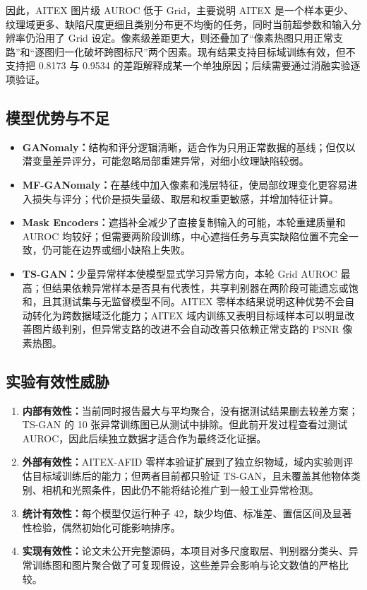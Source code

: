 \documentclass[UTF8,12pt]{ctexart}
\begin{document}
因此，AITEX 图片级 AUROC 低于 Grid，主要说明 AITEX 是一个样本更少、纹理域更多、缺陷尺度更细且类别分布更不均衡的任务，同时当前超参数和输入分辨率仍沿用了 Grid 设定。像素级差距更大，则还叠加了“像素热图只用正常支路”和“逐图归一化破坏跨图标尺”两个因素。现有结果支持目标域训练有效，但不支持把 0.8173 与 0.9534 的差距解释成某一个单独原因；后续需要通过消融实验逐项验证。

\subsection{模型优势与不足}

\begin{itemize}
  \item \textbf{GANomaly：}结构和评分逻辑清晰，适合作为只用正常数据的基线；但仅以潜变量差异评分，可能忽略局部重建异常，对细小纹理缺陷较弱。
  \item \textbf{MF-GANomaly：}在基线中加入像素和浅层特征，使局部纹理变化更容易进入损失与评分；代价是损失量级、取层和权重更敏感，并增加特征计算。
  \item \textbf{Mask Encoders：}遮挡补全减少了直接复制输入的可能，本轮重建质量和 AUROC 均较好；但需要两阶段训练，中心遮挡任务与真实缺陷位置不完全一致，仍可能在边界或细小缺陷上失败。
  \item \textbf{TS-GAN：}少量异常样本使模型显式学习异常方向，本轮 Grid AUROC 最高；但结果依赖异常样本是否具有代表性，共享判别器在两阶段可能遗忘或饱和，且其测试集与无监督模型不同。AITEX 零样本结果说明这种优势不会自动转化为跨数据域泛化能力；AITEX 域内训练又表明目标域样本可以明显改善图片级判别，但异常支路的改进不会自动改善只依赖正常支路的 PSNR 像素热图。
\end{itemize}

\subsection{实验有效性威胁}

\begin{enumerate}
  \item \textbf{内部有效性：}当前同时报告最大与平均聚合，没有据测试结果删去较差方案；TS-GAN 的 10 张异常训练图已从测试中排除。但此前开发过程查看过测试 AUROC，因此后续独立数据才适合作为最终泛化证据。
  \item \textbf{外部有效性：}AITEX-AFID 零样本验证扩展到了独立织物域，域内实验则评估目标域训练后的能力；但两者目前都只验证 TS-GAN，且未覆盖其他物体类别、相机和光照条件，因此仍不能将结论推广到一般工业异常检测。
  \item \textbf{统计有效性：}每个模型仅运行种子 42，缺少均值、标准差、置信区间及显著性检验，偶然初始化可能影响排序。
  \item \textbf{实现有效性：}论文未公开完整源码，本项目对多尺度取层、判别器分类头、异常训练图和图片聚合做了可复现假设，这些差异会影响与论文数值的严格比较。
\end{enumerate}
\end{document}
